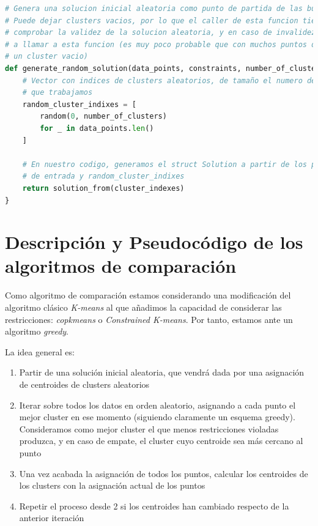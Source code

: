 \documentclass[11pt]{article}
\begin{document}
\begin{lstlisting}[language=Python, style=Boxed]
# Genera una solucion inicial aleatoria como punto de partida de las busquedas
# Puede dejar clusters vacios, por lo que el caller de esta funcion tiene que
# comprobar la validez de la solucion aleatoria, y en caso de invalidez, volver
# a llamar a esta funcion (es muy poco probable que con muchos puntos dejemos
# un cluster vacio)
def generate_random_solution(data_points, constraints, number_of_clusters):
    # Vector con indices de clusters aleatorios, de tamaño el numero de puntos
    # que trabajamos
    random_cluster_indixes = [
        random(0, number_of_clusters)
        for _ in data_points.len()
    ]

    # En nuestro codigo, generamos el struct Solution a partir de los parametros
    # de entrada y random_cluster_indixes
    return solution_from(cluster_indexes)
}
\end{lstlisting}


\pagebreak

\section{Descripción y Pseudocódigo de los algoritmos de comparación}

Como algoritmo de comparación estamos considerando una modificación del algoritmo clásico \emph{K-means} al que añadimos la capacidad de considerar las restricciones: \emph{copkmeans} o \emph{Constrained K-means}. Por tanto, estamos ante un algoritmo \emph{greedy}.

La idea general es:

\begin{enumerate}
    \item Partir de una solución inicial aleatoria, que vendrá dada por una asignación de centroides de clusters aleatorios
    \item Iterar sobre todos los datos en orden aleatorio, asignando a cada punto el mejor cluster en ese momento (siguiendo claramente un esquema greedy). Consideramos como mejor cluster el que menos restricciones violadas produzca, y en caso de empate, el cluster cuyo centroide sea más cercano al punto
    \item Una vez acabada la asignación de todos los puntos, calcular los centroides de los clusters con la asignación actual de los puntos
    \item Repetir el proceso desde 2 si los centroides han cambiado respecto de la anterior iteración
\end{enumerate}
\end{document}
